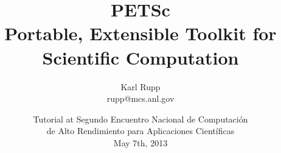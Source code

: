\documentclass[usepdftitle=false,9pt]{beamer}
\author[Karl Rupp]{Karl Rupp \\ \ttfamily rupp@mcs.anl.gov}
\institute[ANL]
{ \footnotesize
  Mathematics and Computer Science Division \\
  Argonne National Laboratory \\
}
\title[PETSc]{ { \Huge PETSc } \\[0.5em] Portable, Extensible Toolkit for Scientific Computation}
\date[WHPC 2013, May 8th, 2013]{ \footnotesize Tutorial at Segundo Encuentro Nacional de Computación \\ de Alto Rendimiento para Aplicaciones Científicas \\[2em] May 7th, 2013}
\begin{document}
\begin{frame}[plain]
 \frametitle{~}
 \titlepage
\end{frame}


\end{document}
